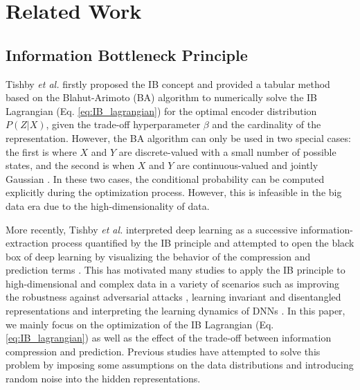 \documentclass[10pt,journal,compsoc]{IEEEtran}
\begin{document}
\section{Related Work}\label{sec:related}
\subsection{Information Bottleneck Principle}
Tishby \emph{et al.} \cite{tishby2000information} firstly proposed the IB concept and provided a tabular method based on the Blahut-Arimoto (BA) algorithm \cite{Tishby2000TheIB, 1405276} to numerically solve the IB Lagrangian (Eq. \ref{eq:IB_lagrangian}) for the optimal encoder distribution $P(Z|X)$, given the trade-off hyperparameter $\beta$ and the cardinality of the representation. However, the BA algorithm can only be used in two special cases: the first is where $X$ and $Y$ are discrete-valued with a small number of possible states, and the second is when $X$ and $Y$ are continuous-valued and jointly Gaussian \cite{Chechik2003InformationBF}. In these two cases, the conditional probability can be computed explicitly during the optimization process. However, this is infeasible in the big data era due to the high-dimensionality of data.

More recently, Tishby \emph{et al.} interpreted deep learning as a successive information-extraction process quantified by the IB principle \cite{Tishby2015DeepLA} and attempted to open the black box of deep learning by visualizing the behavior of the compression and prediction terms \cite{ShwartzZiv2017OpeningTB}. This has motivated many studies to apply the IB principle to high-dimensional and complex data in a variety of scenarios such as improving the robustness against adversarial attacks \cite{Fischer2020TheCE}, learning invariant and disentangled representations \cite{Achille2018EmergenceOI} and interpreting the learning dynamics of DNNs \cite{Saxe2018OnTI,pmlr-v97-goldfeld19a,Wu2019LearnabilityFT}. In this paper, we mainly focus on the optimization of the IB Lagrangian (Eq. \ref{eq:IB_lagrangian}) as well as the effect of the trade-off between information compression and prediction.
Previous studies have attempted to solve this problem by imposing some assumptions on the data distributions and introducing random noise into the hidden representations. \\
\end{document}
